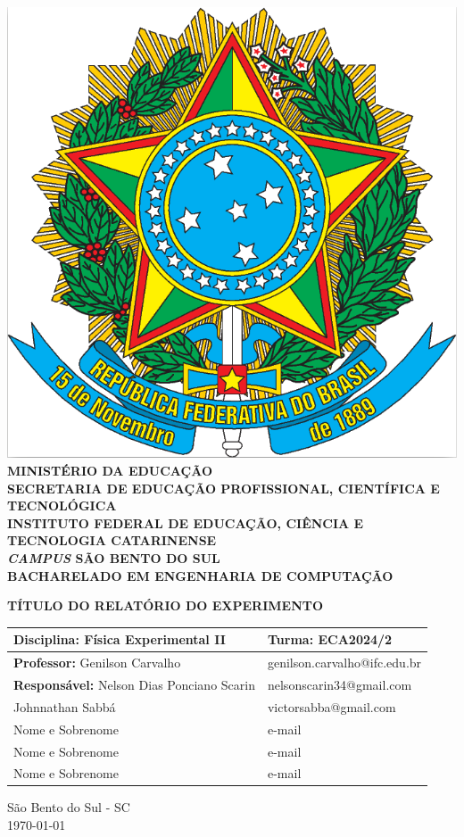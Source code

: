 \documentclass[a4paper, 12pt]{article}
\begin{document}

\begin{center}
	\includegraphics[scale=0.08]{./pictures/brasao.png}\\
	{\footnotesize {\bf MINISTÉRIO DA EDUCAÇÃO\\
		SECRETARIA DE EDUCAÇÃO PROFISSIONAL, CIENTÍFICA E TECNOLÓGICA\\
		INSTITUTO FEDERAL DE EDUCAÇÃO, CIÊNCIA E TECNOLOGIA CATARINENSE\\
		\textit{CAMPUS} SÃO BENTO DO SUL\\
		BACHARELADO EM ENGENHARIA DE COMPUTAÇÃO}}

	\vspace{5cm}
	\textbf{TÍTULO DO RELATÓRIO DO EXPERIMENTO}

	\vspace{3cm}
	\begin{tabular}{|l|l|}
		\hline
		{\bf Disciplina:} Física Experimental II       & {\bf Turma:} ECA2024/2       \\ \hline
		{\bf Professor:} Genilson Carvalho             & genilson.carvalho@ifc.edu.br \\ \hline
		{\bf Responsável:} Nelson Dias Ponciano Scarin & nelsonscarin34@gmail.com     \\ \hline
		Johnnathan Sabbá                               & victorsabba@gmail.com        \\ \hline
		Nome e Sobrenome                               & e-mail                       \\ \hline
		Nome e Sobrenome                               & e-mail                       \\ \hline
		Nome e Sobrenome                               & e-mail                       \\ \hline
	\end{tabular}

	\vspace{7cm}
	São Bento do Sul - SC\\
	\today
\end{center}
\end{document}
